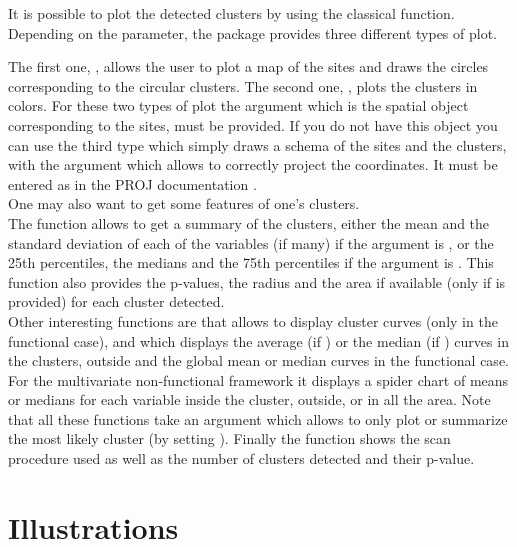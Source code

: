 It is possible to plot the detected clusters by using the classical  function. Depending on the  parameter,
the package  provides three different types of plot.

\noindent The first one, , allows the user to plot a map of the sites and draws the circles corresponding to the circular clusters.
The second one, , plots the clusters in colors.
For these two types of plot the argument 
 which is the spatial object corresponding to the sites, must be provided.
If you do not have this object you can use the third type  which simply draws a schema of the sites and the clusters, with the argument  which allows to correctly project the coordinates. It must be entered as in the PROJ documentation \citep{proj4}. \\

\noindent 
One may also want to get some features of one's clusters. \\
The function  allows to get a summary of the clusters, either the mean and the standard deviation of each of the variables (if many) if the argument  is , or the 25th percentiles, the medians and the 75th percentiles if the argument  is .  This function also provides the p-values, the radius and the area if available (only if  is provided) for each cluster detected. \\
Other interesting functions are  that allows to display cluster curves (only in the functional case), and  which displays the average (if ) or the median (if ) curves in the clusters, outside and the global mean or median curves in the functional case. For the multivariate non-functional framework it displays a spider chart of means or medians for each variable inside the cluster, outside, or in all the area.
Note that all these functions take an argument  which allows to only plot or summarize the most likely cluster (by setting ).
Finally the  function shows the scan procedure used as well as the number of clusters detected and their p-value.

\section{Illustrations} \label{sec:illustrations}


